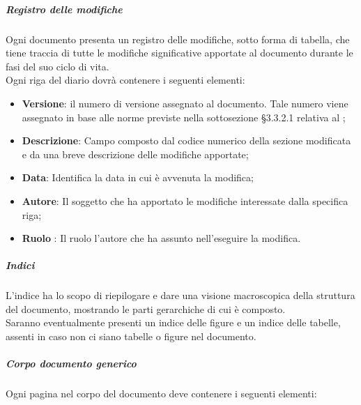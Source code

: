                 \subparagraph{Registro delle modifiche}
                    Ogni documento presenta un registro delle modifiche, sotto forma di tabella, che tiene traccia di tutte le modifiche significative apportate al documento durante le fasi del suo ciclo di vita. \\
                    Ogni riga del diario dovrà contenere i seguenti elementi: \\
                    \begin{itemize}
                        \item\textbf{Versione}: il numero di versione assegnato al documento. Tale numero viene assegnato in base alle norme previste nella sottosezione §3.3.2.1 relativa al ;
                        \item\textbf{Descrizione}: Campo composto dal codice numerico della sezione modificata e da una breve descrizione delle modifiche apportate;
                        \item\textbf{Data}: Identifica la data in cui è avvenuta la modifica;
                        \item\textbf{Autore}: Il soggetto che ha apportato le modifiche interessate dalla specifica riga;
                        \item\textbf{Ruolo} : Il ruolo l’autore che ha assunto nell’eseguire la modifica.
                    \end{itemize}
                \subparagraph{Indici}
                    L’indice ha lo scopo di riepilogare e dare una visione macroscopica della struttura del documento, mostrando le parti gerarchiche di cui è composto. \\
                    Saranno eventualmente presenti un indice delle figure e un indice delle tabelle, assenti in caso non ci siano tabelle o figure nel documento.
                \subparagraph{Corpo documento generico}
                    Ogni pagina nel corpo del documento deve contenere i seguenti elementi:\\
